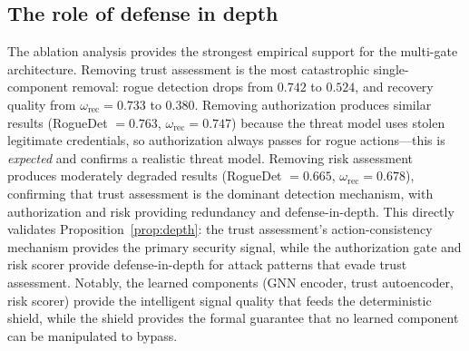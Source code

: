 \documentclass[10pt,journal,compsoc]{IEEEtran}
\begin{document}
\subsection{The role of defense in depth}
The ablation analysis provides the strongest empirical support for the multi-gate architecture.
Removing trust assessment is the most catastrophic single-component removal: rogue detection drops from $0.742$ to $0.524$, and recovery quality from $\omega_{\mathrm{rec}} = 0.733$ to $0.380$.
Removing authorization produces similar results (RogueDet $= 0.763$, $\omega_{\mathrm{rec}} = 0.747$) because the threat model uses stolen legitimate credentials, so authorization always passes for rogue actions---this is \emph{expected} and confirms a realistic threat model.
Removing risk assessment produces moderately degraded results (RogueDet $= 0.665$, $\omega_{\mathrm{rec}} = 0.678$), confirming that trust assessment is the dominant detection mechanism, with authorization and risk providing redundancy and defense-in-depth.
This directly validates Proposition~\ref{prop:depth}: the trust assessment's action-consistency mechanism provides the primary security signal, while the authorization gate and risk scorer provide defense-in-depth for attack patterns that evade trust assessment.
Notably, the learned components (GNN encoder, trust autoencoder, risk scorer) provide the intelligent signal quality that feeds the deterministic shield, while the shield provides the formal guarantee that no learned component can be manipulated to bypass.
\end{document}

